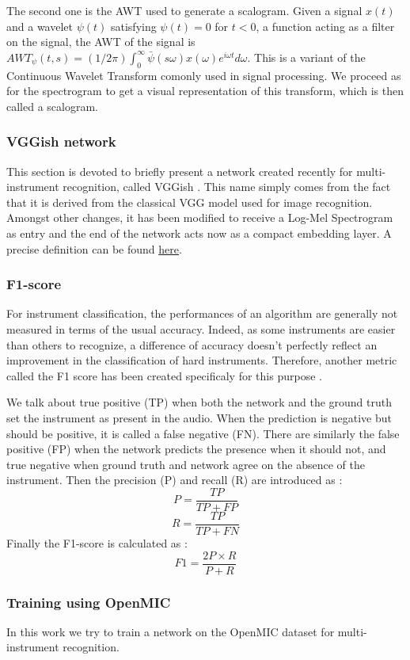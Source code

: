 \documentclass[final]{cvpr}
\begin{document}
The second one is the AWT used to generate a scalogram. Given a signal $x(t)$ and a wavelet $\psi(t)$ satisfying $\psi(t)=0$ for $t<0$, a function acting as a filter on the signal, the AWT of the signal is $AWT_{\psi}(t,s)=(1/2\pi)\int_0^\infty \bar{\psi}(s\omega)x(\omega)e^{i\omega t}d\omega$. This is a variant of the Continuous Wavelet Transform comonly used in signal processing. We proceed as for the spectrogram to get a visual representation of this transform, which is then called a scalogram.
\subsubsection{VGGish network}
This section is devoted to briefly present a network created recently for multi-instrument recognition, called VGGish \cite{VGGish_net}. This name simply comes from the fact that it is derived from the classical VGG model \cite{vgg} used for image recognition. Amongst other changes, it has been modified to receive a Log-Mel Spectrogram as entry and the end of the network acts now as a compact embedding layer. A precise definition can be found \href{https://github.com/tensorflow/models/tree/master/research/audioset/vggish}{here}.
\subsubsection{F1-score}
For instrument classification, the performances of an algorithm are generally not measured in terms of the usual accuracy. Indeed, as some instruments are easier than others to recognize, a difference of accuracy doesn't perfectly reflect an improvement in the classification of hard instruments. Therefore, another metric called the F1 score has been created specificaly for this purpose \cite{metric}. 

We talk about true positive (TP) when both the network and the ground truth set the instrument as present in the audio. When the prediction is negative but should be positive, it is called a false negative (FN). There are similarly the false positive (FP) when the network predicts the presence when it should not, and true negative when ground truth and network agree on the absence of the instrument. Then the precision (P) and recall (R) are introduced as :
\[P = \frac{TP}{TP+FP}\]
\[R=\frac{TP}{TP+FN}\]
Finally the F1-score is calculated as :
\[F1=\frac{2P\times R}{P+R}\]
\subsubsection{Training using OpenMIC}
In this work we try to train a network on the OpenMIC dataset for multi-instrument recognition. 
\end{document}
